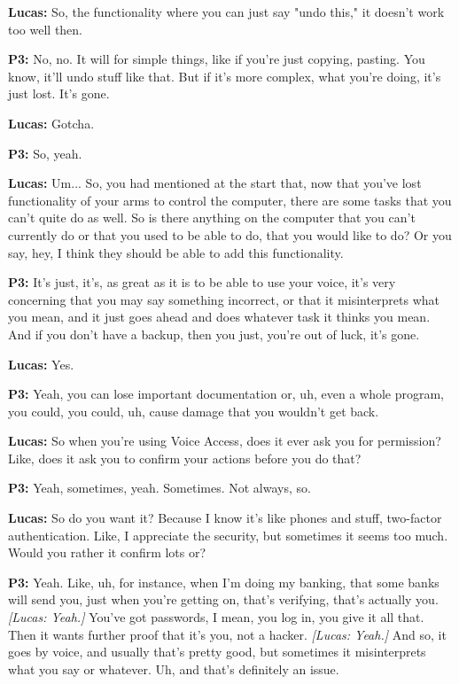 \textbf{Lucas:} So, the functionality where you can just say "undo this," it doesn't work too well then. 

\textbf{P3:} No, no. It will for simple things, like if you're just copying, pasting. You know, it'll undo stuff like that. But if it's more complex, what you're doing, it's just lost. It's gone. 

\textbf{Lucas:} Gotcha. 

\textbf{P3:} So, yeah. 

\textbf{Lucas:} Um... So, you had mentioned at the start that, now that you've lost functionality of your arms to control the computer, there are some tasks that you can't quite do as well. So is there anything on the computer that you can't currently do or that you used to be able to do, that you would like to do? Or you say, hey, I think they should be able to add this functionality. 

\textbf{P3:} It's just, it's, as great as it is to be able to use your voice, it's very concerning that you may say something incorrect, or that it misinterprets what you mean, and it just goes ahead and does whatever task it thinks you mean. And if you don't have a backup, then you just, you're out of luck, it's gone. 

\textbf{Lucas:} Yes. 

\textbf{P3:} Yeah, you can lose important documentation or, uh, even a whole program, you could, you could, uh, cause damage that you wouldn't get back. 

\textbf{Lucas:} So when you're using Voice Access, does it ever ask you for permission? Like, does it ask you to confirm your actions before you do that? 

\textbf{P3:} Yeah, sometimes, yeah. Sometimes. Not always, so. 

\textbf{Lucas:} So do you want it? Because I know it's like phones and stuff, two-factor authentication. Like, I appreciate the security, but sometimes it seems too much. Would you rather it confirm lots or? 

\textbf{P3:} Yeah. Like, uh, for instance, when I'm doing my banking, that some banks will send you, just when you're getting on, that's verifying, that's actually you. \textit{[Lucas: Yeah.]} You've got passwords, I mean, you log in, you give it all that. Then it wants further proof that it's you, not a hacker. \textit{[Lucas: Yeah.]} And so, it goes by voice, and usually that's pretty good, but sometimes it misinterprets what you say or whatever. Uh, and that's definitely an issue. 

